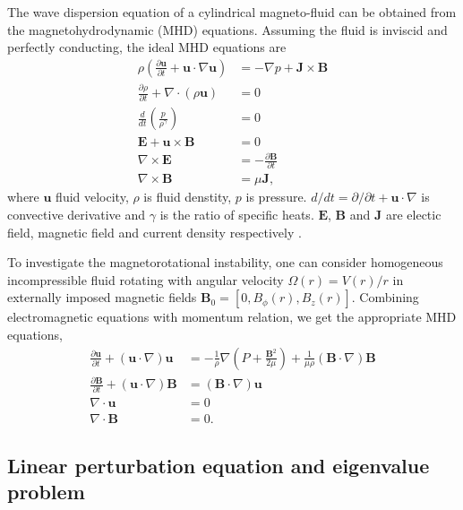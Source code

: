 \documentclass{jfm}
\newcommand{\del}{\nabla}
\begin{document}
The wave dispersion equation of a cylindrical magneto-fluid can be obtained 
from the magnetohydrodynamic (MHD) equations. Assuming the fluid is inviscid 
and perfectly conducting, the ideal MHD equations are 
\begin{align}
    \rho\left(\frac{\partial\mathbf{u}}{\partial t}+\mathbf{u}\cdot\del\mathbf{u}\right) &= -\del p +\mathbf{J}\times\mathbf{B} \\
    \frac{\partial \rho}{\partial t} + \del\cdot(\rho \mathbf{u})&=0 \\
    \frac{d}{dt}\left(\frac{p}{\rho^\gamma}\right)&=0\\
    \mathbf{E}+\mathbf{u}\times\mathbf{B}&=0 \\
    \del\times \mathbf{E} &= -\frac{\partial \mathbf{B}}{\partial t} \\
    \del \times \mathbf{B} &= \mu \mathbf{J},
\end{align}
where $\mathbf{u}$ fluid velocity, $\rho$ is fluid denstity, $p$ is pressure. 
$d/dt=\partial/\partial t +\mathbf{u}\cdot\del$ is convective derivative and 
$\gamma$ is the ratio of specific heats. $\mathbf{E}$, $\mathbf{B}$ and 
$\mathbf{J}$ are electic field, magnetic field and current density respectively
\cite[see][]{Freidberg1987}.

To investigate the magnetorotational instability, one can consider homogeneous
incompressible fluid rotating 
with angular velocity $\Omega(r)=V(r) / r$ in externally imposed magnetic 
fields $\mathbf{B}_0 = [0,B_\phi(r),B_z(r)]$. Combining electromagnetic 
equations with momentum relation, we get the appropriate MHD equations,
\begin{align}
    \frac{\partial \mathbf{u}}{\partial t}+(\mathbf{u}\cdot\del)\mathbf{u} &= -\frac{1}{\rho}\del\left(P+\frac{\mathbf{B}^2}{2\mu}\right)+\frac{1}{\mu\rho}(\mathbf{B}\cdot\del)\mathbf{B}\\
    \frac{\partial \mathbf{B}}{\partial t} +(\mathbf{u}\cdot\del)\mathbf{B} &=(\mathbf{B}\cdot\del)\mathbf{u} \\
    \del\cdot\mathbf{u}&=0\\
    \del \cdot \mathbf{B} &=0.
\end{align}


%
%
\subsection{Linear perturbation equation and eigenvalue problem}
\end{document}
